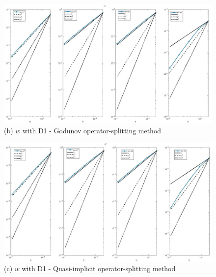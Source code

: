 \documentclass[a4paper,11pt]{article}
\begin{document}
\begin{figure}[h]
\begin{center}
\includegraphics[width =\textwidth]{./D1_w_1_GO.jpg}
\caption*{(b) $w$ with D1 - Godunov operator-splitting method}
\end{center}
\end{figure}
\begin{figure}[H]
\begin{center}
\includegraphics[width =\textwidth]{./D1_w_1_OS.jpg}
\caption*{(c) $w$ with D1 - Quasi-implicit operator-splitting method}
\end{center}
\end{figure}
\restoregeometry
\newpage
\end{document}
